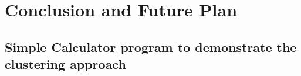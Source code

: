 \documentclass{uofsthesis-cs}
\begin{document}
\chapter{Conclusion and Future Plan}









%

\uofsappendix

\begin{appendices}

\chapter{Simple Calculator program to demonstrate the clustering approach}



\end{appendices}
\end{document}
